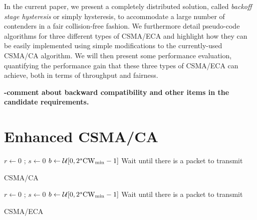 \documentclass[conference]{IEEEtran}
\newcommand{\Az}[1]{{\bf{#1}}}
\begin{document}
In the current paper, we present a completely distributed solution, called {\it backoff stage hysteresis} or simply hysteresis, to accommodate a large number of contenders in a fair collision-free fashion. We furthermore detail pseudo-code algorithms for three different types of CSMA/ECA and highlight how they can be easily implemented using simple modifications to the currently-used CSMA/CA algorithm. We will then present some performance evaluation, quantifying the performance gain that these three types of CSMA/ECA can achieve, both in terms of throughput and fairness.

\Az{-comment about backward compatibility and other items in the candidate requirements.}

\section{Enhanced CSMA/CA}

\begin{algorithm}
{
  $r \leftarrow 0$ ; $s \leftarrow 0$ \;
  $b \leftarrow \mathcal{U}[0,2^s\rm{CW}_{min}-1]$\;
  Wait until there is a packet to transmit \;
}
\caption{CSMA/CA}
\label{alg:CSMA_CA}
\end{algorithm}


\begin{algorithm}
{
  $r \leftarrow 0$ ; $s \leftarrow 0$ \;
  $b \leftarrow \mathcal{U}[0,2^s\rm{CW}_{min}-1]$\;
  Wait until there is a packet to transmit \;
}
\caption{CSMA/ECA}
\label{alg:CSMA_ECA}
\end{algorithm}
\end{document}

